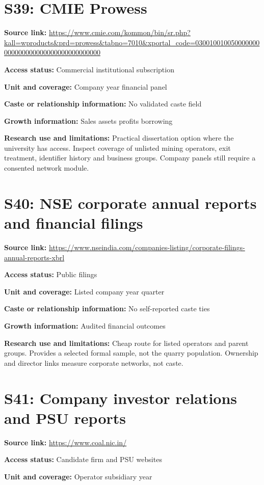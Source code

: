 \documentclass[11pt,a4paper]{report}
\begin{document}
\section{S39: CMIE Prowess}\hypertarget{S39}{}
\textbf{Source link:} \url{https://www.cmie.com/kommon/bin/sr.php?kall=wproducts&prd=prowess&tabno=7010&xportal_code=030010010050000000000000000000000000000000000}

\textbf{Access status:} Commercial institutional subscription

\textbf{Unit and coverage:} Company year financial panel

\textbf{Caste or relationship information:} No validated caste field

\textbf{Growth information:} Sales assets profits borrowing

\textbf{Research use and limitations:} Practical dissertation option where the university has access. Inspect coverage of unlisted mining operators, exit treatment, identifier history and business groups. Company panels still require a consented network module.

\section{S40: NSE corporate annual reports and financial filings}\hypertarget{S40}{}
\textbf{Source link:} \url{https://www.nseindia.com/companies-listing/corporate-filings-annual-reports-xbrl}

\textbf{Access status:} Public filings

\textbf{Unit and coverage:} Listed company year quarter

\textbf{Caste or relationship information:} No self-reported caste ties

\textbf{Growth information:} Audited financial outcomes

\textbf{Research use and limitations:} Cheap route for listed operators and parent groups. Provides a selected formal sample, not the quarry population. Ownership and director links measure corporate networks, not caste.

\section{S41: Company investor relations and PSU reports}\hypertarget{S41}{}
\textbf{Source link:} \url{https://www.coal.nic.in/}

\textbf{Access status:} Candidate firm and PSU websites

\textbf{Unit and coverage:} Operator subsidiary year
\end{document}
